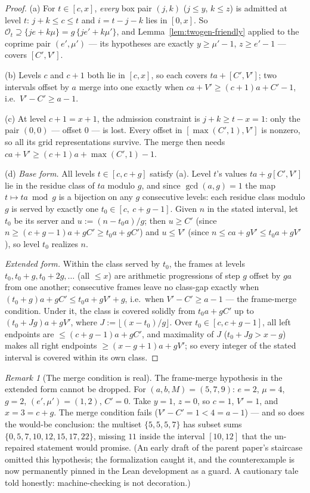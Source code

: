 \documentclass[11pt,reqno]{amsart}
\theoremstyle{plain}
\theoremstyle{definition}
\theoremstyle{remark}
\newtheorem{remark}[theorem]{Remark}
\begin{document}
\begin{proof}
(a) For $t \in [c, x]$, \emph{every} box pair $(j, k)$ ($j \le y$, $k \le z$) is
admitted at level $t$: $j + k \le c \le t$ and $i = t - j - k$ lies in $[0, x]$.
So $\mathcal{O}_t \supseteq \{je + k\mu\} = g\,\{j e' + k \mu'\}$, and
Lemma~\ref{lem:twogen-friendly} applied to the coprime pair $(e', \mu')$ --- its
hypotheses are exactly $y \ge \mu' - 1$, $z \ge e' - 1$ --- covers $[C', V']$.

(b) Levels $c$ and $c+1$ both lie in $[c, x]$, so each covers $ta + [C', V']$; two
intervals offset by $a$ merge into one exactly when $ca + V' \ge (c+1)a + C' - 1$,
i.e.\ $V' - C' \ge a - 1$.

(c) At level $c + 1 = x + 1$, the admission constraint is $j + k \ge t - x = 1$:
only the pair $(0,0)$ --- offset $0$ --- is lost. Every offset in $[\max(C',1),
V']$ is nonzero, so all its grid representations survive. The merge then needs
$ca + V' \ge (c+1)a + \max(C', 1) - 1$.

(d) \emph{Base form.} All levels $t \in [c, c+g]$ satisfy (a). Level $t$'s values
$ta + g[C', V']$ lie in the residue class of $ta$ modulo $g$, and since
$\gcd(a, g) = 1$ the map $t \mapsto ta \bmod g$ is a bijection on any $g$
consecutive levels: each residue class modulo $g$ is served by exactly one $t_0 \in
[c,\ c + g - 1]$. Given $n$ in the stated interval, let $t_0$ be its server and
$u := (n - t_0 a)/g$; then $u \ge C'$ (since $n \ge (c+g-1)a + gC' \ge t_0 a +
g C'$) and $u \le V'$ (since $n \le ca + gV' \le t_0 a + gV'$), so level $t_0$
realizes $n$.

\emph{Extended form.} Within the class served by $t_0$, the frames at levels $t_0,
t_0 + g, t_0 + 2g, \dots$ (all $\le x$) are arithmetic progressions of step $g$
offset by $ga$ from one another; consecutive frames leave no class-gap exactly when
$(t_0 + g)a + gC' \le t_0 a + gV' + g$, i.e.\ when $V' - C' \ge a - 1$ --- the
frame-merge condition. Under it, the class is covered solidly from $t_0 a + gC'$ up
to $(t_0 + Jg)a + gV'$, where $J := \lfloor (x - t_0)/g \rfloor$. Over $t_0 \in
[c, c+g-1]$, all left endpoints are $\le (c+g-1)a + gC'$, and maximality of $J$
($t_0 + Jg > x - g$) makes all right endpoints $\ge (x - g + 1)a + gV'$; so every
integer of the stated interval is covered within its own class.
\end{proof}

\begin{remark}[The merge condition is real]\label{rem:579}
The frame-merge hypothesis in the extended form cannot be dropped. For $(a, b, M)
= (5, 7, 9)$: $e = 2$, $\mu = 4$, $g = 2$, $(e', \mu') = (1, 2)$, $C' = 0$. Take
$y = 1$, $z = 0$, so $c = 1$, $V' = 1$, and $x = 3 = c + g$. The merge condition
fails ($V' - C' = 1 < 4 = a - 1$) --- and so does the would-be conclusion: the
multiset $\{5, 5, 5, 7\}$ has subset sums $\{0, 5, 7, 10, 12, 15, 17, 22\}$,
missing $11$ inside the interval $[10, 12]$ that the un-repaired statement would
promise. (An early draft of the parent paper's staircase omitted this hypothesis;
the formalization caught it, and the counterexample is now permanently pinned in
the Lean development as a guard. A cautionary tale told honestly:
machine-checking is not decoration.)
\end{remark}
\end{document}
